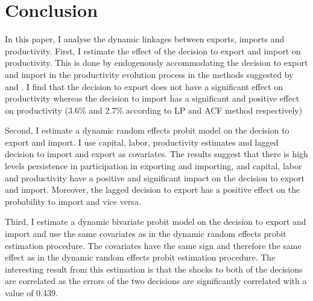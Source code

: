 \documentclass[12pt]{article}
\begin{document}
\section{Conclusion}\label{sec:conclusion}

In this paper, I analyse the dynamic linkages between exports, imports
and productivity. First, I estimate the effect of the decision to export and import
on productivity. This is done by endogenously accommodating the
decision to export and import in the productivity evolution process in
the methods suggested by \textcite{levinsohn2003estimating} and
\textcite{ackerberg2006structural}. I find that the decision to export
does not have a significant effect on productivity whereas the
decision to import has a significant and positive effect  on
productivity (3.6\% and 2.7\% according to LP and ACF method respectively) 

Second, I estimate a dynamic random effects probit model on the
decision to export and import. I use  capital, labor,  productivity
estimates and lagged decision to import and
export as covariates. The results suggest that there is high levels persistence in participation in exporting and importing,
and capital, labor and  productivity have a positive and significant
impact on the decision to export and import. Moreover, the lagged
decision to export has a positive effect on the probability to import
and vice versa. 

Third, I estimate a dynamic bivariate probit model  on the
decision to export and import and use the same covariates as in the
dynamic random effects probit estimation procedure. The covariates
have the same sign and therefore the same effect as in the dynamic
random effects probit estimation procedure.
The interesting result from this estimation is that the shocks to both
of the decisions are
correlated as the  errors of the two decisions are
significantly correlated with a value of 0.439.   %



\end{document}

